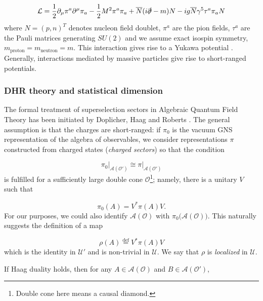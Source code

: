 \documentclass[a4paper,11pt]{article}
\newcommand{\eqdef}{\overset{\mathrm{def}}{=}}
\begin{document}
\begin{equation}
    \mathcal{L} = \frac{1}{2} \partial_{\mu} \pi^a \partial^{\mu} \pi_a - \frac{1}{2} M^2 \pi^a \pi_a + \overline{N} (i \slashed{\partial} - m) N - i g \overline{N} \gamma^5 \tau^a \pi_a N
\end{equation}
%
where $N = (p, n)^T$ denotes nucleon field doublet, $\pi^a$ are the pion fields, $\tau^a$ are the Pauli matrices generating $SU(2)$ and we assume exact isospin symmetry, $m_{\text{proton}} = m_{\text{neutron}} = m$. This interaction gives rise to a Yukawa potential \cite{Nucleons} \cite{Peskin}. Generally, interactions mediated by massive particles give rise to short-ranged potentials.

\subsubsection{DHR theory and statistical dimension}

The formal treatment of superselection sectors in Algebraic Quantum Field Theory has been initiated by Doplicher, Haag and Roberts \cite{DHR}. The general assumption is that the charges are short-ranged: if $\pi_0$ is the vacuum GNS representation of the algebra of observables, we consider representations $\pi$ constructed from charged states (\textit{charged sectors}) so that the condition

\begin{equation}
    \left. \pi_0 \right|_{\mathcal{A}(\mathcal{O}')} \cong \left. \pi \right|_{\mathcal{A}(\mathcal{O}')}
\end{equation}
%
is fulfilled for a sufficiently large double cone $\mathcal{O}$\footnote{Double cone here means a causal diamond.}; namely, there is a unitary $V$ such that

\begin{equation}
    \pi_0 (A) = V^* \pi (A) V \text{.}
\end{equation}
%
For our purposes, we could also identify $\mathcal{A}(\mathcal{O})$ with $\pi_0 \big(\mathcal{A}(\mathcal{O}) \big)$. This naturally suggests the definition of a map

\begin{equation}
    \rho (A) \eqdef V^* \pi(A) V
\end{equation}
%
which is the identity in $\mathcal{U}'$ and is non-trivial in $\mathcal{U}$. We say that $\rho$ is \textit{localized} in $\mathcal{U}$.

If Haag duality holds, then for any $A \in \mathcal{A}(\mathcal{O})$ and $B \in \mathcal{A}(\mathcal{O}')$,
\end{document}
